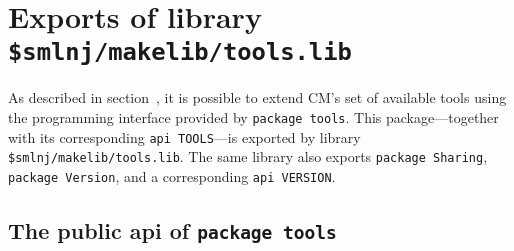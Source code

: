 
\section{Exports of library {\tt \$smlnj/makelib/tools.lib}}

As described in section~, it is possible to extend
CM's set of available tools using the programming interface provided
by {\tt package tools}.  This package---together with its
corresponding {\tt api TOOLS}---is exported by library {\tt
\$smlnj/makelib/tools.lib}.  The same library also exports {\tt package
Sharing}, {\tt package Version}, and a corresponding {\tt api
VERSION}.

\subsection{The public api of {\tt package tools}}

